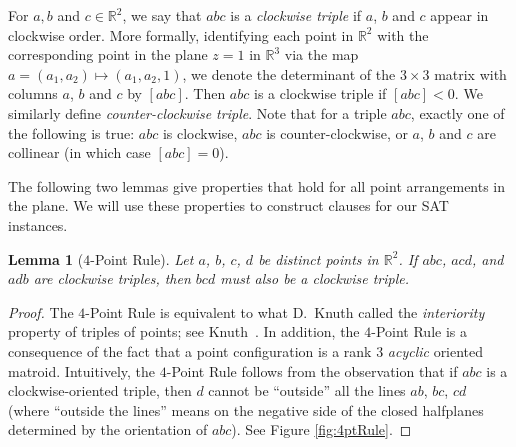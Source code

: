\documentclass[12pt]{amsart}
\newtheorem{lemma}[theorem]{Lemma}
\theoremstyle{remark}
\newcommand{\RR}{{\mathbb R}}
\newcommand{\be}{\begin{enumerate}}
\newcommand{\ee}{\end{enumerate}}
\begin{document}

For $a,b$ and $c\in\RR^2$, we say that $abc$ is a \emph{clockwise triple}
if $a$, $b$ and $c$ appear in clockwise order.
More formally, identifying each point in $\RR^2$
with the corresponding point in the plane $z=1$ in $\RR^3$ via the map $a = (a_{1},a_{2}) \mapsto (a_{1},a_{2},1)$,
we denote
the determinant of the $3\times 3$ matrix with columns $a$, $b$ and $c$
by $[abc]$.
Then $abc$ is a clockwise triple if $[abc] < 0$.
We similarly define \emph{counter-clockwise triple}.
Note that for a triple $abc$, exactly one of the following is true:
$abc$ is clockwise,
$abc$ is counter-clockwise, or
$a$, $b$ and $c$ are collinear (in which case $[abc]=0$).

The following two lemmas give properties that hold for all
point arrangements in the plane.
We will use these properties to construct clauses for our SAT instances.

\begin{lemma}[$4$-Point Rule] \label{L:4pt}
Let $a$, $b$, $c$, $d$ be distinct points in $\RR^2$.
If $abc$, $acd$, and $adb$ are clockwise triples, then $bcd$ must also be a clockwise triple.
\end{lemma}

\begin{proof}
The $4$-Point Rule is equivalent to what D.~Knuth
called the \emph{interiority}
property of triples of points;
see Knuth~\cite[p.~4, Axiom~4]{Knu92}. In addition, the $4$-Point Rule is a consequence of the fact that a point configuration is a rank 3 \emph{acyclic} oriented matroid. %
 Intuitively, the $4$-Point Rule follows from the observation that if $abc$ is a clockwise-oriented triple, then $d$ cannot be ``outside'' all the lines $ab$, $bc$, $cd$ (where ``outside the lines'' means on the negative side of the closed halfplanes determined by the orientation of $abc$). See Figure \ref{fig:4ptRule}.
\end{proof}
\end{document}
